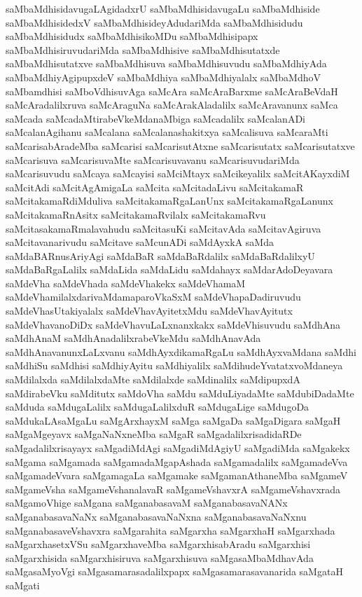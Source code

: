 {saMbaMdhisidavugaLAgidadxrU
saMbaMdhisidavugaLu
saMbaMdhiside
saMbaMdhisidedxV
saMbaMdhisideyAdudariMda
saMbaMdhisidudu
saMbaMdhisidudx
saMbaMdhisikoMDu
saMbaMdhisipapx
saMbaMdhisiruvudariMda
saMbaMdhisive
saMbaMdhisutatxde
saMbaMdhisutatxve
saMbaMdhisuva
saMbaMdhisuvudu
saMbaMdhiyAda
saMbaMdhiyAgipupxdeV
saMbaMdhiya
saMbaMdhiyalalx
saMbaMdhoV
saMbamdhisi
saMboVdhisuvAga
saMcAra
saMcAraBarxme
saMcAraBeVdaH
saMcAradalilxruva
saMcAraguNa
saMcArakAladalilx
saMcAravanunx
saMca
saMcada
saMcadaMtirabeVkeMdanaMbiga
saMcadalilx
saMcalanADi
saMcalanAgihanu
saMcalana
saMcalanashakitxya
saMcalisuva
saMcaraMti
saMcarisabAradeMba
saMcarisi
saMcarisutAtxne
saMcarisutatx
saMcarisutatxve
saMcarisuva
saMcarisuvaMte
saMcarisuvavanu
saMcarisuvudariMda
saMcarisuvudu
saMcaya
saMcayisi
saMciMtayx
saMcikeyalilx
saMcitAKayxdiM
saMcitAdi
saMcitAgAmigaLa
saMcita
saMcitadaLivu
saMcitakamaR
saMcitakamaRdiMduliva
saMcitakamaRgaLanUnx
saMcitakamaRgaLanunx
saMcitakamaRnAsitx
saMcitakamaRvilalx
saMcitakamaRvu
saMcitasakamaRmalavahudu
saMcitasuKi
saMcitavAda
saMcitavAgiruva
saMcitavanarivudu
saMcitave
saMcunADi
saMdAyxkA
saMda
saMdaBARnusAriyAgi
saMdaBaR
saMdaBaRdalilx
saMdaBaRdalilxyU
saMdaBaRgaLalilx
saMdaLida
saMdaLidu
saMdahayx
saMdarAdoDeyavara
saMdeVha
saMdeVhada
saMdeVhakekx
saMdeVhamaM
saMdeVhamilalxdarivaMdamaparoVkaSxM
saMdeVhapaDadiruvudu
saMdeVhasUtakiyalalx
saMdeVhavAyitetxMdu
saMdeVhavAyitutx
saMdeVhavanoDiDx
saMdeVhavuLaLxnanxkakx
saMdeVhisuvudu
saMdhAna
saMdhAnaM
saMdhAnadalilxrabeVkeMdu
saMdhAnavAda
saMdhAnavanunxLaLxvanu
saMdhAyxdikamaRgaLu
saMdhAyxvaMdana
saMdhi
saMdhiSu
saMdhisi
saMdhiyAyitu
saMdhiyalilx
saMdihudeYvatatxvoMdaneya
saMdilalxda
saMdilalxdaMte
saMdilalxde
saMdinalilx
saMdipupxdA
saMdirabeVku
saMditutx
saMdoVha
saMdu
saMduLiyadaMte
saMdubiDadaMte
saMduda
saMdugaLalilx
saMdugaLalilxduR
saMdugaLige
saMdugoDa
saMdukaLAsaMgaLu
saMgArxhayxM
saMga
saMgaDa
saMgaDigara
saMgaH
saMgaMgeyavx
saMgaNaNxneMba
saMgaR
saMgadalilxrisadidaRDe
saMgadalilxrisayayx
saMgadiMdAgi
saMgadiMdAgiyU
saMgadiMda
saMgakekx
saMgama
saMgamada
saMgamadaMgapAshada
saMgamadalilx
saMgamadeVva
saMgamadeVvara
saMgamagaLa
saMgamake
saMgamanAthaneMba
saMgameV
saMgameVsha
saMgameVshanalavaR
saMgameVshavxrA
saMgameVshavxrada
saMgamoVhige
saMgana
saMganabasavaM
saMganabasavaNANx
saMganabasavaNaNx
saMganabasavaNaNxna
saMganabasavaNaNxnu
saMganabasaveVshavxra
saMgarahita
saMgarxha
saMgarxhaH
saMgarxhada
saMgarxhasetxVSu
saMgarxhaveMba
saMgarxhisabAradu
saMgarxhisi
saMgarxhisida
saMgarxhisiruva
saMgarxhisuva
saMgasaMbaMdhavAda
saMgasaMyoVgi
saMgasamarasadalilxpapx
saMgasamarasavanarida
saMgataH
saMgati
}
